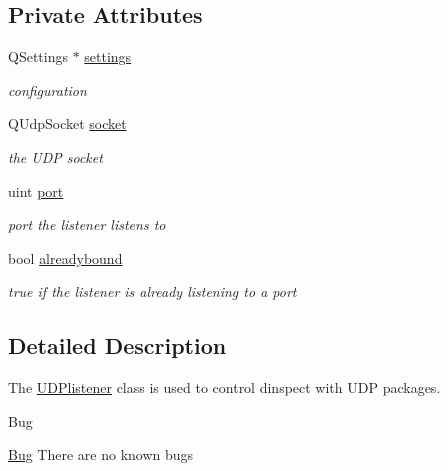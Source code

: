 \subsection*{Private Attributes}
\begin{DoxyCompactItemize}
\item 
\mbox{\label{classUDPlistener_a14614017bcc3fc38e0caad8d4a9781a6}} 
Q\+Settings $\ast$ \hyperlink{classUDPlistener_a14614017bcc3fc38e0caad8d4a9781a6}{settings}
\begin{DoxyCompactList}\small\item\em configuration \end{DoxyCompactList}\item 
\mbox{\label{classUDPlistener_a4e391608821969dc58f1cf509d0206fd}} 
Q\+Udp\+Socket \hyperlink{classUDPlistener_a4e391608821969dc58f1cf509d0206fd}{socket}
\begin{DoxyCompactList}\small\item\em the U\+DP socket \end{DoxyCompactList}\item 
\mbox{\label{classUDPlistener_ab1fb04f4812b70f607727e27cedf26b1}} 
uint \hyperlink{classUDPlistener_ab1fb04f4812b70f607727e27cedf26b1}{port}
\begin{DoxyCompactList}\small\item\em port the listener listens to \end{DoxyCompactList}\item 
\mbox{\label{classUDPlistener_ad032b16f2451215e0f4bd7b6998fc11d}} 
bool \hyperlink{classUDPlistener_ad032b16f2451215e0f4bd7b6998fc11d}{alreadybound}
\begin{DoxyCompactList}\small\item\em true if the listener is already listening to a port \end{DoxyCompactList}\end{DoxyCompactItemize}


\subsection{Detailed Description}
The \hyperlink{classUDPlistener}{U\+D\+Plistener} class is used to control dinspect with U\+DP packages. 

\begin{DoxyRefDesc}{Bug}
\item[\hyperlink{bug__bug000005}{Bug}]There are no known bugs\end{DoxyRefDesc}


